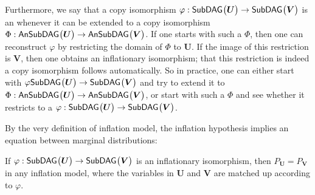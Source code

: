 
Furthermore, we say that a copy isomorphism $\varphi : {\operatorname{\mathsf{SubDAG}}_{}}\bigl\lparen\bm{U}\bigr\rparen\to{\operatorname{\mathsf{SubDAG}}_{}}\bigl\lparen\bm{V}\bigr\rparen$ is an  whenever it can be extended to a copy isomorphism $\Phi : {\operatorname{\mathsf{AnSubDAG}}_{}}\bigl\lparen\bm{U}\bigr\rparen\to{\operatorname{\mathsf{AnSubDAG}}_{}}\bigl\lparen\bm{V}\bigr\rparen$. If one starts with such a $\Phi$, then one can reconstruct $\varphi$ by restricting the domain of $\Phi$ to $\bm{U}$. If the image of this restriction is $\bm{V}$, then one obtains an inflationary isomorphism; that this restriction is indeed a copy isomorphism follows automatically. So in practice, one can either start with $\varphi {\operatorname{\mathsf{SubDAG}}_{}}\bigl\lparen\bm{U}\bigr\rparen\to{\operatorname{\mathsf{SubDAG}}_{}}\bigl\lparen\bm{V}\bigr\rparen$ and try to extend it to $\Phi : {\operatorname{\mathsf{AnSubDAG}}_{}}\bigl\lparen\bm{U}\bigr\rparen\to{\operatorname{\mathsf{AnSubDAG}}_{}}\bigl\lparen\bm{V}\bigr\rparen$, or start with such a $\Phi$ and see whether it restricts to a $\varphi:{\operatorname{\mathsf{SubDAG}}_{}}\bigl\lparen\bm{U}\bigr\rparen\to{\operatorname{\mathsf{SubDAG}}_{}}\bigl\lparen\bm{V}\bigr\rparen$.



By the very definition of inflation model, the inflation hypothesis implies an equation between marginal distributions:

\begin{lemma}
	If $\varphi:{\operatorname{\mathsf{SubDAG}}_{}}\bigl\lparen\bm{U}\bigr\rparen\to{\operatorname{\mathsf{SubDAG}}_{}}\bigl\lparen\bm{V}\bigr\rparen$ is an inflationary isomorphism, then $P_{\bm{U}} = P_{\bm{V}}$ in any inflation model, where the variables in $\bm{U}$ and $\bm{V}$ are matched up according to $\varphi$.
	\label{lem:coincide}
\end{lemma}

